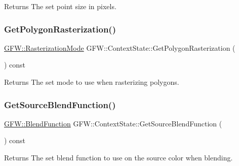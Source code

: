 \begin{DoxyReturn}{Returns}
The set point size in pixels. 
\end{DoxyReturn}
\mbox{\label{class_g_f_w_1_1_context_state_ae999ededfc3a52439dad56e6979c906d}} 
\subsubsection{\texorpdfstring{Get\+Polygon\+Rasterization()}{GetPolygonRasterization()}}
{\footnotesize\ttfamily \hyperlink{namespace_g_f_w_a9e0ba6f593449f3060559ead1bc7e92f}{G\+F\+W\+::\+Rasterization\+Mode} G\+F\+W\+::\+Context\+State\+::\+Get\+Polygon\+Rasterization (\begin{DoxyParamCaption}{ }\end{DoxyParamCaption}) const}

\begin{DoxyReturn}{Returns}
The set mode to use when rasterizing polygons. 
\end{DoxyReturn}
\mbox{\label{class_g_f_w_1_1_context_state_abd9c0c7e6dc4d31cf9b9203718dfd3ee}} 
\subsubsection{\texorpdfstring{Get\+Source\+Blend\+Function()}{GetSourceBlendFunction()}}
{\footnotesize\ttfamily \hyperlink{namespace_g_f_w_ac19434e926d01e02140f07e74ff36f3c}{G\+F\+W\+::\+Blend\+Function} G\+F\+W\+::\+Context\+State\+::\+Get\+Source\+Blend\+Function (\begin{DoxyParamCaption}{ }\end{DoxyParamCaption}) const}

\begin{DoxyReturn}{Returns}
The set blend function to use on the source color when blending. 
\end{DoxyReturn}
\mbox{\label{class_g_f_w_1_1_context_state_aa7ea61ad3f05efb7da33eef7a51ad547}} 
